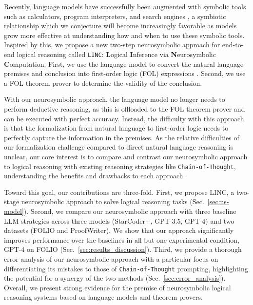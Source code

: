 \documentclass[11pt]{article}
\newcommand{\ag}[1]{\textcolor{purple}{}}
\newcommand{\ag}[1]{\textcolor{red}{\bf\small [AG: #1]}}
\begin{document}

Recently, language models have successfully been augmented with symbolic tools such as calculators, program interpreters, and search engines \citep{schick2023toolformer}, a symbiotic relationship which we conjecture will become increasingly favorable as models grow more effective at understanding how and when to use these symbolic tools. Inspired by this, we propose a new two-step neurosymbolic approach for end-to-end logical reasoning called \texttt{LINC}: \textbf{L}ogical \textbf{I}nference via \textbf{N}eurosymbolic \textbf{C}omputation. First, we use the language model to convert the natural language premises and conclusion into first-order logic (FOL) expressions \cite{barwise2000language, enderton2001mathematical}. Second, we use a FOL theorem prover to determine the validity of the conclusion. 

With our neurosymbolic approach, the language model no longer needs to perform deductive reasoning, as this is offloaded to the FOL theorem prover and can be executed with perfect accuracy. Instead, the difficulty with this approach is that the formalization from natural language to first-order logic needs to perfectly capture the information in the premises. As the relative difficulties of our formalization challenge compared to direct natural language reasoning is unclear, our core interest is to compare and contrast our neurosymbolic approach to logical reasoning with existing reasoning strategies like \texttt{Chain-of-Thought}, understanding the benefits and drawbacks to each approach. 


Toward this goal, our contributions are three-fold. First, we propose LINC, a two-stage neurosymbolic approach to solve logical reasoning tasks (Sec.~\ref{sec:ns-model}). Second, we compare our neurosymbolic approach with three baseline LLM strategies across three models (StarCoder+, GPT-3.5, GPT-4) and two datasets (FOLIO and ProofWriter). We show that our approach significantly improves performance over the baselines in all but one experimental condition, GPT-4 on FOLIO (Sec.~\ref{sec:results_discussion}). Third, we provide a thorough error analysis of our neurosymbolic approach with a particular focus on differentiating its mistakes to those of \texttt{Chain-of-Thought} prompting, highlighting the potential for a synergy of the two methods (Sec.~\ref{sec:error_analysis}). Overall, we present strong evidence for the premise of neurosymbolic logical reasoning systems based on language models and theorem provers.
\end{document}
